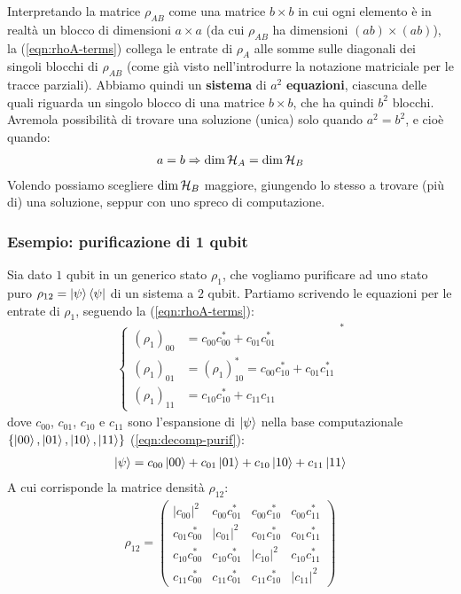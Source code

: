 \documentclass[../../InformazioneQuantistica.tex]{subfiles}
\begin{document}
Interpretando la matrice $\rho_{AB}$ come una matrice $b\times b$ in cui ogni elemento è in realtà un blocco di dimensioni $a \times a$ (da cui $\rho_{AB}$ ha dimensioni $(ab)\times (ab)$), la (\ref{eqn:rhoA-terms}) collega le entrate di $\rho_A$ alle somme sulle diagonali dei singoli blocchi di $\rho_{AB}$ (come già visto nell'introdurre la notazione matriciale per le tracce parziali). Abbiamo quindi un \textbf{sistema} di $a^2$ \textbf{equazioni}, ciascuna delle quali riguarda un singolo blocco di una matrice $b\times b$, che ha quindi $b^2$ blocchi. Avremola possibilità di trovare una soluzione (unica) solo quando $a^2 = b^2$, e cioè quando:
\begin{align*}
a=b\Rightarrow \operatorname{dim}\mathcal{H}_A = \operatorname{dim}\mathcal{H}_B
\end{align*}
Volendo possiamo scegliere $\operatorname{dim}\mathcal{H}_B$ maggiore, giungendo lo stesso a trovare (più di) una soluzione, seppur con uno spreco di computazione.


\subsubsection{Esempio: purificazione di 1 qubit}
Sia dato $1$ qubit in un generico stato $\rho_1$, che vogliamo purificare ad uno stato puro $\rho_{12} = \Ket{\psi}\Bra{\psi}$ di un sistema a $2$ qubit. Partiamo scrivendo le equazioni per le entrate di $\rho_1$, seguendo la (\ref{eqn:rhoA-terms}):
\begin{align}\label{eqn:sist-purificazione}
\begin{cases}
(\rho_1)_{00} &= c_{00} c_{00}^* + c_{01} c^*_{01}\\
(\rho_1)_{01} &= (\rho_1)^*_{10} = c_{00}c_{10}^* + c_{01}c_{11}^*\\
(\rho_1)_{11} &= c_{10}c_{10}^* + c_{11}c_{11}
\end{cases}^*
\end{align}
dove $c_{00}$, $c_{01}$, $c_{10}$ e $c_{11}$ sono l'espansione di $\Ket{\psi}$ nella base computazionale $\{\Ket{00}, \Ket{01}, \Ket{10}, \Ket{11}\}$ (\ref{eqn:decomp-purif}):
\begin{align*}
\Ket{\psi}=c_{00}\Ket{00}+c_{01}\Ket{01}+c_{10}\Ket{10}+c_{11}\Ket{11}
\end{align*}
A cui corrisponde la matrice densità $\rho_{12}$:
\begin{align*}
\rho_{12} = \left(
\begin{array}{cc|cc}
|c_{00}|^2 & c_{00}c_{01}^* & c_{00}c_{10}^* & c_{00}c_{11}^*\\
c_{01}c_{00}^* & |c_{01}|^2 & c_{01}c_{10}^* & c_{01}c_{11}^*\\ \hline
c_{10}c_{00}^* & c_{10}c_{01}^* & |c_{10}|^2 & c_{10}c_{11}^*\\
c_{11}c_{00}^* & c_{11}c_{01}^* & c_{11}c_{10}^* & |c_{11}|^2
\end{array}
\right)
\end{align*}
\end{document}
